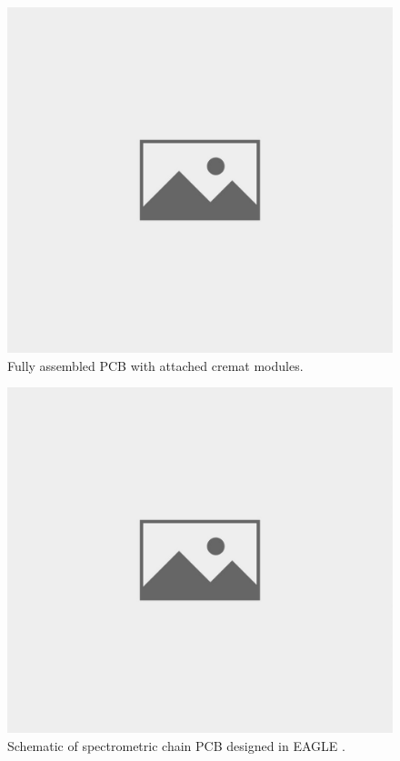 \begin{figure}[H]
 \centering
 \includegraphics[scale=0.35, angle = 0]{./pictures/NoPicture.jpg}
 \caption{Fully assembled PCB with attached cremat modules.}
 \label{PCBphyss}
 
\end{figure}





\begin{figure}[H]
 \centering
 \includegraphics[scale=0.35, angle = 0]{./pictures/NoPicture.jpg}
 \caption{Schematic of spectrometric chain PCB designed in EAGLE \cite{eagle}.}
 \label{schematic}
 
\end{figure}


